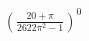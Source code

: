 \documentclass[preview]{standalone}
\begin{document}
\begin{align*}
\left( \frac{20+\pi}{2622\pi^{2}-1} \right)^{0}
\end{align*}
\end{document}
